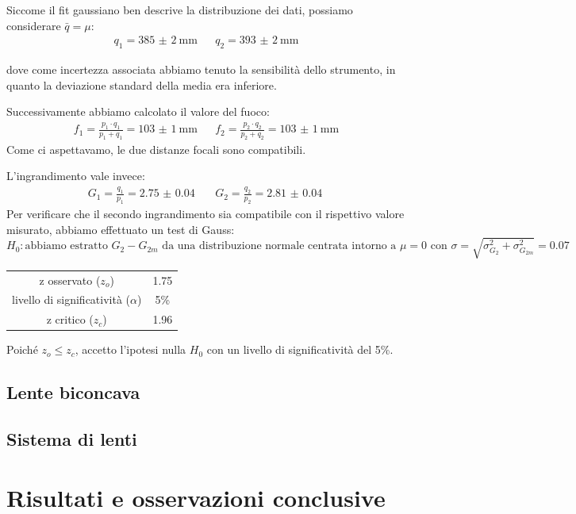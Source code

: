 \documentclass[a4paper]{article}
\begin{document}
    Siccome il fit gaussiano ben descrive la distribuzione dei dati, possiamo considerare $\bar{q} = \mu$:
    \begin{align*}
    	q_1 = \SI{385(2)}{\mm} && q_2 = \SI{393(2)}{\mm}
    \end{align*}
    
    dove come incertezza associata abbiamo tenuto la sensibilità dello strumento, in quanto la deviazione standard della media era inferiore.
    
    Successivamente abbiamo calcolato il valore del fuoco:
    \begin{align*}
    	f_1=\frac{p_1\cdot q_1}{p_1+q_1}=\SI{103(1)}{\mm} && f_2=\frac{p_2\cdot q_2}{p_2+q_2}=\SI{103(1)}{\mm}
    \end{align*}
    Come ci aspettavamo, le due distanze focali sono compatibili.
    
    L'ingrandimento vale invece:
    \begin{align*}
    	G_1=\frac{q_1}{p_1}=\SI{2.75(4)}{} && G_2=\frac{q_2}{p_2}=\SI{2.81(4)}{}
    \end{align*}
    Per verificare che il secondo ingrandimento sia compatibile con il rispettivo valore misurato, abbiamo effettuato un test di Gauss:
    \[
    H_0: \text{abbiamo estratto $G_2-G_{2m}$ da una distribuzione normale centrata intorno a $\mu=0$ con $\sigma=\sqrt{\sigma_{G_2}^2+\sigma_{G_{2m}}^2}=0.07$}
    \]
    \begin{table}[H]
    	\centering
    	\begin{tabular}{|c|c|}
    		\hline
    		z osservato ($z_o$) & 1.75 \\
    		livello di significatività ($\alpha$) & 5\% \\
    		z critico ($z_c$) & 1.96 \\ \hline
    	\end{tabular}
    	\label{tab:gauss-1}
    \end{table}
    Poiché $z_o\leq z_c$, accetto l'ipotesi nulla $H_0$ con un livello di significatività del 5\%.
    \subsection{Lente biconcava}
    \subsection{Sistema di lenti}
\section{Risultati e osservazioni conclusive}
\end{document}
